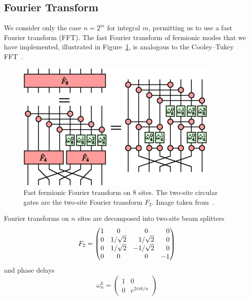 \documentclass[12pt, twocolumn]{article}
\newcommand*{\eu}{e}
\newcommand*{\iu}{i}
\begin{document}
  \subsection{Fourier Transform}
  We consider only the case \( n = 2^{m} \) for integral \( m \), permitting us to use a fast Fourier transform (FFT). The fast Fourier transform of fermionic modes that we have implemented, illustrated in Figure~\ref{fig:ffft}, is analogous to the Cooley--Tukey FFT~\cite{Cooley1965}.
  \begin{figure}
    \centering
    \includegraphics[width=\linewidth]{images/ffft.png}
    \caption{Fast fermionic Fourier transform on \( 8 \) sites. The two-site circular gates are the two-site Fourier transform \( F_{2} \). Image taken from~\cite{Ferris2014}.%
      \label{fig:ffft}}
  \end{figure}
  Fourier transforms on \( n \) sites are decomposed into two-site beam splitters
  \begin{equation}
    F_{2}
      = \begin{pmatrix}
          1 & 0            & \hphantom{-}0            & \hphantom{-}0 \\
          0 & 1 / \sqrt{2} & \hphantom{-}1 / \sqrt{2} & \hphantom{-}0 \\
          0 & 1 / \sqrt{2} &           - 1 / \sqrt{2} & \hphantom{-}0 \\
          0 & 0            & \hphantom{-}0            &           - 1
        \end{pmatrix}
  \end{equation}
  and phase delays
  \begin{equation}
    \omega_{n}^{k}
      = \begin{pmatrix}
          1 & 0 \\
          0 & \eu^{2 \iu \pi k / n}
        \end{pmatrix}
  \end{equation}
\end{document}
